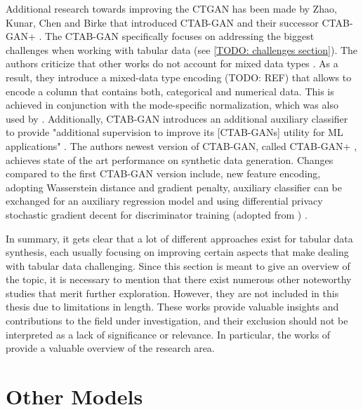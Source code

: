 Additional research towards improving the CTGAN has been made by Zhao, Kunar, Chen and Birke that introduced CTAB-GAN \cite{zhao2021CTABGANEffectiveTablea} and their successor CTAB-GAN+ \cite{zhao2022CTABGANEnhancingTabular}.
The CTAB-GAN specifically focuses on addressing the biggest challenges when working with tabular data (see \autoref{TODO: challenges section}).
The authors criticize that other works do not account for mixed data types \cite{zhao2022CTABGANEnhancingTabular}.
As a result, they introduce a mixed-data type encoding (TODO: REF) that allows to encode a column that contains both, categorical and numerical data.
This is achieved in conjunction with the mode-specific normalization, which was also used by \cite{xu2018SynthesizingTabularData, xu2019ModelingTabularData}.
Additionally, CTAB-GAN introduces an additional auxiliary classifier to provide "additional supervision to improve its [CTAB-GANs] utility for ML applications" \cite[p. 2]{zhao2021CTABGANEffectiveTablea}.
The authors newest version of CTAB-GAN, called CTAB-GAN+ \cite{zhao2022CTABGANEnhancingTabular}, achieves state of the art performance on synthetic data generation.
Changes compared to the first CTAB-GAN version include, new feature encoding, adopting Wasserstein distance and gradient penalty, auxiliary classifier can be exchanged for an auxiliary regression model
and using differential privacy stochastic gradient decent \cite{abadi2016DeepLearningDifferentiala} for discriminator training (adopted from \cite{jordon2018PATEGANGeneratingSynthetic}) \cite{zhao2022CTABGANEnhancingTabular}.

In summary, it gets clear that a lot of different approaches exist for tabular data synthesis, each usually focusing on improving certain aspects that make dealing with tabular data challenging.
Since this section is meant to give an overview of the topic, 
it is necessary to mention that there exist numerous other noteworthy studies that merit further exploration. 
However, they are not included in this thesis due to limitations in length. 
These works provide valuable insights and contributions to the field under investigation, and their exclusion should not be interpreted as a lack of significance or relevance. 
In particular, the works of \cite{fan2020RelationalDataSynthesisa, hernandez2022SyntheticDataGeneration, bourou2021ReviewTabularData} provide a valuable overview of the research area.


\section{Other Models}
\label{ch:relatedWork-transformers}

